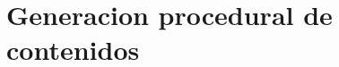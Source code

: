 %
%
\chapter[Generacion procedural de contenidos]{\label{identificadorReferenciaCruzada}
Generacion procedural de contenidos}


